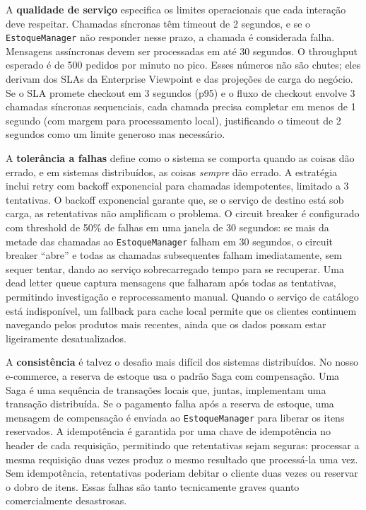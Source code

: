 A \textbf{qualidade de serviço} especifica os limites operacionais que cada
interação deve respeitar. Chamadas síncronas têm timeout de 2 segundos, e se o
\texttt{EstoqueManager} não responder nesse prazo, a chamada é considerada
falha. Mensagens assíncronas devem ser processadas em até 30 segundos. O
throughput esperado é de 500 pedidos por minuto no pico. Esses números não são
chutes; eles derivam dos SLAs da Enterprise Viewpoint e das projeções de carga
do negócio. Se o SLA promete checkout em 3 segundos (p95) e o fluxo de checkout
envolve 3 chamadas síncronas sequenciais, cada chamada precisa completar em
menos de 1 segundo (com margem para processamento local), justificando o timeout
de 2 segundos como um limite generoso mas necessário.

A \textbf{tolerância a falhas} define como o sistema se comporta quando as coisas
dão errado, e em sistemas distribuídos, as coisas \emph{sempre} dão errado.
A estratégia inclui retry com backoff exponencial para chamadas idempotentes,
limitado a 3 tentativas. O backoff exponencial garante que, se o serviço de
destino está sob carga, as retentativas não amplificam o problema. O circuit
breaker é configurado com threshold de 50\% de falhas em uma janela de 30
segundos: se mais da metade das chamadas ao \texttt{EstoqueManager} falham em
30 segundos, o circuit breaker ``abre'' e todas as chamadas subsequentes falham
imediatamente, sem sequer tentar, dando ao serviço sobrecarregado tempo para
se recuperar. Uma dead letter queue captura mensagens que falharam após todas as
tentativas, permitindo investigação e reprocessamento manual. Quando o serviço de
catálogo está indisponível, um fallback para cache local permite que os clientes
continuem navegando pelos produtos mais recentes, ainda que os dados possam estar
ligeiramente desatualizados.

A \textbf{consistência} é talvez o desafio mais difícil dos sistemas distribuídos.
No nosso e-commerce, a reserva de estoque usa o padrão Saga com compensação. Uma
Saga é uma sequência de transações locais que, juntas, implementam uma transação
distribuída. Se o pagamento falha após a reserva de estoque, uma mensagem de
compensação é enviada ao \texttt{EstoqueManager} para liberar os itens reservados.
A idempotência é garantida por uma chave de idempotência no header de cada
requisição, permitindo que retentativas sejam seguras: processar a mesma
requisição duas vezes produz o mesmo resultado que processá-la uma vez. Sem
idempotência, retentativas poderiam debitar o cliente duas vezes ou reservar o
dobro de itens. Essas falhas são tanto tecnicamente graves quanto comercialmente
desastrosas.

